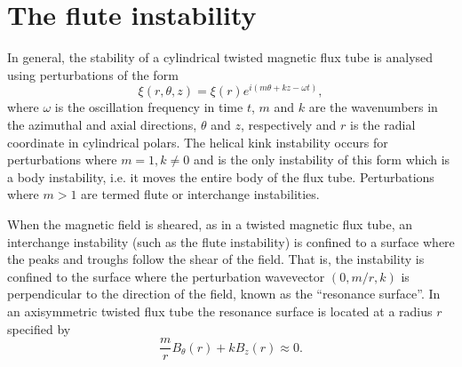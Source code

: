\documentclass[fleqn,usenatbib]{mnras}
\begin{document}
\section{The flute instability}
\label{sec-flute-intro}

In general, the stability of a cylindrical twisted magnetic flux tube is analysed using perturbations of the form
\begin{equation}
  \label{eq:kink_perturbation}
\xi(r, \theta, z) = \xi(r) e^{i(m\theta + kz -\omega t)},
\end{equation}
where $\omega$ is the oscillation frequency in time $t$, $m$ and $k$
are the wavenumbers in the azimuthal and axial directions, $\theta$
and $z$, respectively and $r$ is the radial coordinate in cylindrical 
polars. The helical kink instability occurs for perturbations where $m=1,
k\ne0$ and is the only instability of this form which is a body instability,
i.e.{} it moves the entire body of the flux tube. Perturbations where $m>1$
are termed flute or interchange instabilities.

When the magnetic field is sheared, as in a twisted magnetic flux tube, an
interchange instability (such as the flute instability) is confined to
a surface where the peaks and troughs follow the shear of the field. That is,
the instability is confined to the surface where the perturbation wavevector
$(0, m/r, k)$ is perpendicular to the direction of the field, known as the
``resonance surface''. In an axisymmetric twisted flux tube the resonance
surface is located at a radius $r$ specified by
\begin{equation}
  \label{eq:resonant_surface}
\frac{m}{r} B_{\theta}(r) + kB_z(r) \approx 0.
\end{equation}
\end{document}

